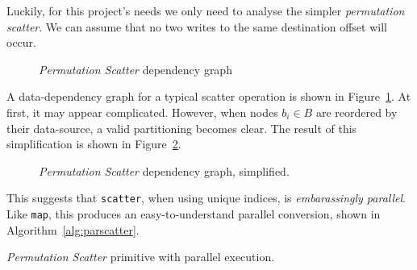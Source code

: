Luckily, for this project's needs we only need to analyse the simpler \emph{permutation scatter}. We can assume that no two writes to the same destination offset will occur.

\begin{figure}[h]
  \caption{\emph{Permutation Scatter} dependency graph}
  \label{fig:scatgraph1}
  \begin{center}
  \end{center}
\end{figure}
A data-dependency graph for a typical scatter operation is shown in Figure~\ref{fig:scatgraph1}.
At first, it may appear complicated. However, when nodes $b_i \in B$ are reordered by their data-source, a valid partitioning becomes clear. The result of this simplification is shown in Figure~\ref{fig:scatgraph2}.

\begin{figure}[h]
  \caption{\emph{Permutation Scatter} dependency graph, simplified.}
  \label{fig:scatgraph2}
  \begin{center}
  \end{center}
\end{figure}

This suggests that \verb|scatter|, when using unique indices, is \emph{embarassingly parallel}. Like \verb|map|, this produces an easy-to-understand parallel conversion, shown in Algorithm~\ref{alg:parscatter}.

\begin{algorithm}
  \caption{\emph{Permutation Scatter} primitive with parallel execution.}
  \label{alg:parscatter}

  \begin{algorithmic}
      \EndPFor
    \EndFunction
  \end{algorithmic}
\end{algorithm}
